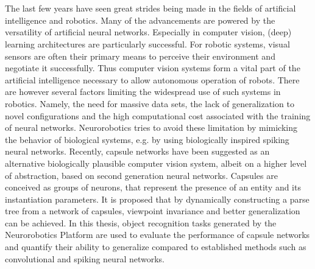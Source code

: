 \chapter{\abstractname}
The last few years have seen great strides being made in the fields of artificial intelligence and robotics. Many of the advancements are powered by the versatility of artificial neural networks. Especially in computer vision, (deep) learning architectures are particularly successful. For robotic systems, visual sensors are often their primary means to perceive their environment and negotiate it successfully. Thus computer vision systems form a vital part of the artificial intelligence necessary to allow autonomous operation of robots. There are however several factors limiting the widespread use of such systems in robotics. Namely, the need for massive data sets, the lack of generalization to novel configurations and the high computational cost associated with the training of neural networks. Neurorobotics tries to avoid these limitation by mimicking the behavior of biological systems, e.g. by using biologically inspired spiking neural networks. Recently, capsule networks have been suggested as an alternative biologically plausible computer vision system, albeit on a higher level of abstraction, based on second generation neural networks. Capsules are conceived as groups of neurons, that represent the presence of an entity and its instantiation parameters. It is proposed that by dynamically constructing a parse tree from a network of capsules, viewpoint invariance and better generalization can be achieved. In this thesis, object recognition tasks generated by the Neurorobotics Platform are used to evaluate the performance of capsule networks and quantify their ability to generalize compared to established methods such as convolutional and spiking neural networks.